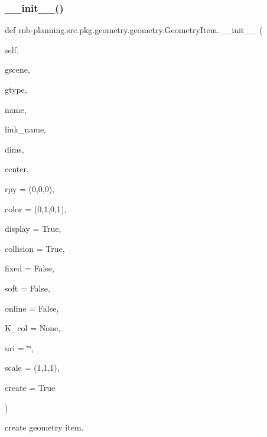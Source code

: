 \subsubsection{\texorpdfstring{\+\_\+\+\_\+init\+\_\+\+\_\+()}{\_\_init\_\_()}}
{\footnotesize\ttfamily def rnb-\/planning.\+src.\+pkg.\+geometry.\+geometry.\+Geometry\+Item.\+\_\+\+\_\+init\+\_\+\+\_\+ (\begin{DoxyParamCaption}\item[{}]{self,  }\item[{}]{gscene,  }\item[{}]{gtype,  }\item[{}]{name,  }\item[{}]{link\+\_\+name,  }\item[{}]{dims,  }\item[{}]{center,  }\item[{}]{rpy = {\ttfamily (0,0,0)},  }\item[{}]{color = {\ttfamily (0,1,0,1)},  }\item[{}]{display = {\ttfamily True},  }\item[{}]{collision = {\ttfamily True},  }\item[{}]{fixed = {\ttfamily False},  }\item[{}]{soft = {\ttfamily False},  }\item[{}]{online = {\ttfamily False},  }\item[{}]{K\+\_\+col = {\ttfamily None},  }\item[{}]{uri = {\ttfamily \char`\"{}\char`\"{}},  }\item[{}]{scale = {\ttfamily (1,1,1)},  }\item[{}]{create = {\ttfamily True} }\end{DoxyParamCaption})}



create geometry item. 

